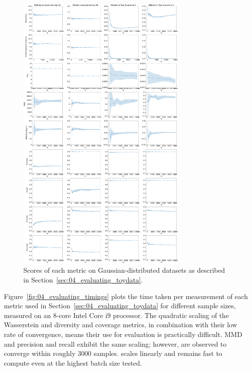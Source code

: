 \begin{figure}[htpb]
    \centering
    \includegraphics[width=0.75\textwidth]{figures/04-ML4Sim/evaluating/toy_scores_2.pdf}
    \caption{Scores of each metric on Gaussian-distributed datasets as described in Section~\ref{sec:04_evaluating_toydata}.}
    \label{fig:04_evaluating_toyscores2}
\end{figure}

Figure~\ref{fig:04_evaluating_timings} plots the time taken per measurement of each metric used in Section~\ref{sec:04_evaluating_toydata} for different sample sizes, measured on an 8-core Intel Core i9 processor.
The quadratic scaling of the Wasserstein and diversity and coverage metrics, in combination with their low rate of convergence, means their use for evaluation is practically difficult.
MMD and precision and recall exhibit the same scaling; however, are observed to converge within roughly 3000 samples.
\fgdinf scales linearly and remains fast to compute even at the highest batch size tested.

